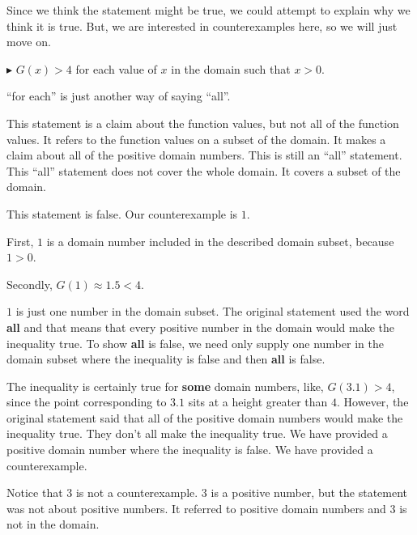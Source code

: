 \documentclass{ximera}
\begin{document}
Since we think the statement might be true, we could attempt to explain why we think it is true.  But, we are interested in counterexamples here, so we will just move on.















\textbf{\textcolor{red!70!darkgray}{$\blacktriangleright$}} $G(x) > 4$ for each value of $x$ in the domain such that $x > 0$. 



``for each'' is just another way of saying ``all''.

This statement is a claim about the function values, but not all of the function values.  It refers to the function values on a subset of the domain.  It makes a claim about all of the positive domain numbers. This is still an ``all'' statement.  This ``all'' statement does not cover the whole domain.  It covers a subset of the domain.



This statement is false. Our counterexample is $1$.  


First, $1$ is a domain number included in the described domain subset, because $1 > 0$. 


Secondly, $G(1) \approx 1.5 < 4$. 



$1$ is just one number in the domain subset.   The original statement used the word \textbf{all} and that means that every positive number in the domain would make the inequality true.  To show \textbf{all} is false, we need only supply one number in the domain subset where the inequality is false and then \textbf{all} is false. 

The inequality is certainly true for \textbf{some} domain numbers, like, $G(3.1) > 4$, since the point corresponding to $3.1$ sits at a height greater than $4$.  However, the original statement said that all of the positive domain numbers would make the inequality true. They don't all make the inequality true.  We have provided a positive domain number where the inequality is false. We have provided a counterexample. 

Notice that $3$ is not a counterexample.  $3$ is a positive number, but the statement was not about positive numbers.  It referred to positive domain numbers and $3$ is not in the domain.
\end{document}
